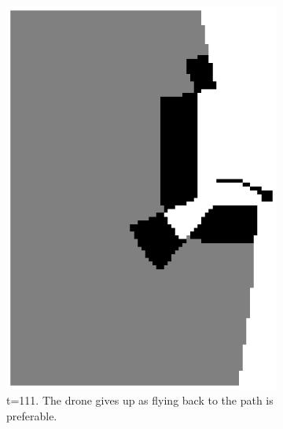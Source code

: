 \begin{figure}
\begin{subfigure}[t]{0.3\textwidth}
\includegraphics[width=\textwidth]{Figures/convex_corner/t111_gives_up.eps}
\caption{t=111. The drone gives up as flying back to the path is preferable.}
\label{fig:convex_corner2}
\end{subfigure}
\,
\begin{subfigure}[t]{0.3\textwidth}

\end{subfigure}
\end{figure}
